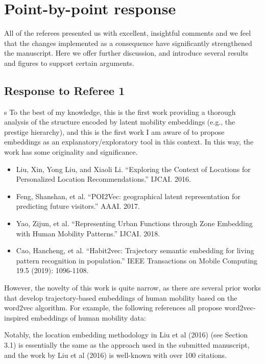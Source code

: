\documentclass[12pt,a4paper]{article}
\newcounter{comment}[subsection]
\newcommand{\rcomment}[1]{%
\vspace{10pt}
\begin{sectionbox}
s #1
\end{sectionbox}
}
\begin{document}
%
%
\clearpage
\section{Point-by-point response}
All of the referees presented us with excellent, insightful comments and we feel that the changes implemented as a consequence have signiﬁcantly strengthened the manuscript. Here we offer further discussion, and introduce several results and figures to support certain arguments.
\subsection{Response to Referee 1}
\setcounter{section}{1}


\rcomment{%
	To the best of my knowledge, this is the first work providing a thorough analysis of the structure encoded by latent mobility embeddings (e.g., the prestige hierarchy), and this is the first work I am aware of to propose embeddings as an explanatory/exploratory tool in this context. In this way, the work has some originality and significance.

	\begin{itemize}
		\item Liu, Xin, Yong Liu, and Xiaoli Li. ``Exploring the Context of Locations for Personalized Location Recommendations.'' IJCAI. 2016.
		\item Feng, Shanshan, et al. ``POI2Vec: geographical latent representation for predicting future visitors.'' AAAI. 2017.
		\item Yao, Zijun, et al. ``Representing Urban Functions through Zone Embedding with Human Mobility Patterns.'' IJCAI. 2018.
		\item Cao, Hancheng, et al. ``Habit2vec: Trajectory semantic embedding for living pattern recognition in population.'' IEEE Transactions on Mobile Computing 19.5 (2019): 1096-1108.
	\end{itemize}


	However, the novelty of this work is quite narrow, as there are several prior works that develop trajectory-based embeddings of human mobility based on the word2vec algorithm. For example, the following references all propose word2vec-inspired embeddings of human mobility data:


	Notably, the location embedding methodology in Liu et al (2016) (see Section 3.1) is essentially the same as the approach used in the submitted manuscript, and the work by Liu et al (2016) is well-known with over 100 citations.
}
\end{document}
